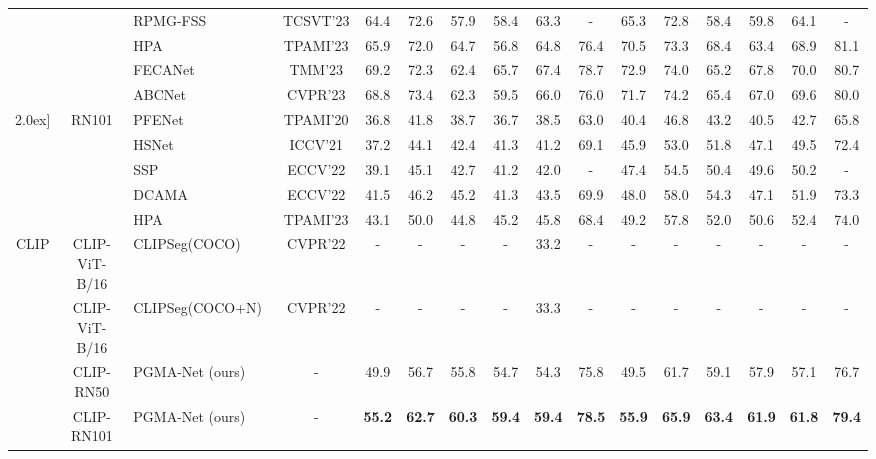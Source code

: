 \documentclass[lettersize,journal]{IEEEtran}
\begin{document}
\begin{table*}
{\begin{tabular}{cclc|cccccc|cccccc}
        && RPMG-FSS~\cite{zhang2023rpmg} & TCSVT'23  & 64.4 & 72.6 & 57.9 & 58.4 & 63.3 & - & 65.3 & 72.8 & 58.4 & 59.8 & 64.1 & -  \\  

        && HPA\cite{cheng2023hpa} & TPAMI'23  & 65.9 & 72.0 & 64.7 & 56.8 & 64.8 & 76.4 & 70.5 & 73.3 & 68.4 & 63.4 & 68.9 & 81.1  \\  

        && FECANet~\cite{liu2023fecanet} & TMM'23  & 69.2 & 72.3 & 62.4 & 65.7 & 67.4 & 78.7 & 72.9 & 74.0 & 65.2 & 67.8 & 70.0 & 80.7  \\

        && ABCNet~\cite{Wang_2023_CVPR} & CVPR'23 &68.8&73.4&62.3&59.5&66.0&76.0&71.7&74.2&65.4&67.0&69.6&80.0 \\  
        \cline{2-16} \-2.0ex]
        
        &\multirow{5}{*}{RN101} & PFENet~\cite{tian2020prior} & TPAMI'20  & {36.8} & {41.8} & {38.7} & {36.7} & {38.5} & {63.0} & {40.4} & {46.8} & {43.2} & {40.5} & {42.7} & {65.8} \\
        && HSNet~\cite{min2021hypercorrelation} & ICCV'21   & {37.2} & {44.1} & {42.4} & {41.3} & {41.2} & {69.1} & {45.9} & {53.0} & {51.8} & {47.1} & {49.5} & {72.4} \\
        && SSP~\cite{fan2022self}  & ECCV'22   & 39.1 & 45.1& 42.7 & 41.2& 42.0& - & 47.4 & 54.5 & 50.4 & 49.6 & 50.2 & -  \\
        && DCAMA~\cite{shi2022dense} & ECCV'22  & 41.5 & 46.2 & 45.2 & 41.3 & 43.5 & 69.9 & 48.0 & 58.0 & 54.3 & 47.1 & 51.9 & 73.3  \\  
        && HPA\cite{cheng2023hpa} & TPAMI'23  & 43.1 & 50.0 & 44.8 & 45.2 & 45.8 & 68.4 & 49.2 & 57.8 & 52.0 & 50.6 & 52.4 & 74.0  \\  
        \midrule 
     
        \multirow{5}{*}{CLIP} &CLIP-ViT-B/16&  CLIPSeg(COCO)~\cite{luddecke2022image} & CVPR'22 & - & - & - & - & 33.2 & - & - & - & - & - & - & - \\
        &CLIP-ViT-B/16&  CLIPSeg(COCO+N)~\cite{luddecke2022image} & CVPR'22 & - & - & - & - & 33.3 & - & - & - & - & - & - & - \\ 
              
        &CLIP-RN50& PGMA-Net (ours) &- &  49.9 & 56.7 & 55.8 & 54.7 & 54.3 & 75.8 & 49.5 & 61.7 & 59.1 & 57.9 & 57.1 & 76.7 \\
        
        &CLIP-RN101& PGMA-Net (ours)  &-&  \textbf{55.2} & \textbf{62.7} & \textbf{60.3} & \textbf{59.4} & \textbf{59.4} & \textbf{78.5} & \textbf{55.9} & \textbf{65.9} & \textbf{63.4} & \textbf{61.9} & \textbf{61.8} & \textbf{79.4} \\


        \bottomrule
      \end{tabular}
      }


  \hfill
\end{table*}
\end{document}

